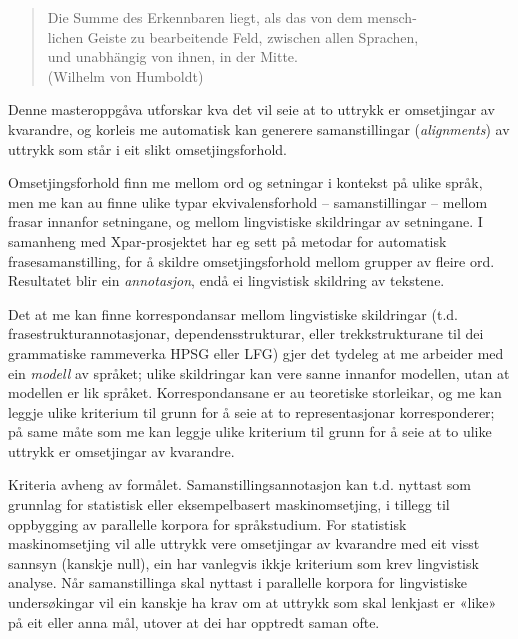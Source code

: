 \documentclass[12pt,a4paper,oneside,draft]{report}
\newcommand{\q}[2]{\begin{quotation}\raggedleft{}#1\\\vspace{0.2cm}(#2)\vspace{1.2cm}\end{quotation}}
\begin{document}
\label{SEC:innleiing}

   \q{Die Summe des Erkennbaren liegt, als das von dem mensch-\\lichen
   Geiste zu bearbeitende Feld, zwischen allen Sprachen,\\
   und unabhängig von ihnen, in der Mitte.}
   {Wilhelm von Humboldt}


Denne masteroppgåva utforskar kva det vil seie at to uttrykk er
 omsetjingar av kvarandre, og korleis me automatisk kan generere
 samanstillingar (\emph{alignments}) av uttrykk som står i eit slikt
 omsetjingsforhold.

Omsetjingsforhold finn me mellom ord og setningar i kontekst på ulike
 språk, men me kan au finne ulike typar ekvivalensforhold --
 samanstillingar -- mellom frasar innanfor setningane, og mellom
 lingvistiske skildringar av setningane. I samanheng med
 Xpar-prosjektet \citep{xpar2008rcn,dyvik2009lmp} har eg sett på
 metodar for automatisk frasesamanstilling, for å skildre
 omsetjingsforhold mellom grupper av fleire ord. Resultatet blir ein
 \emph{annotasjon}, endå ei lingvistisk skildring av tekstene.



Det at me kan finne korrespondansar mellom lingvistiske skildringar
 (t.d. frasestrukturannotasjonar, dependensstrukturar, eller
 trekkstrukturane til dei grammatiske rammeverka HPSG eller LFG) gjer
 det tydeleg at me arbeider med ein \emph{modell} av språket; ulike
 skildringar kan vere sanne innanfor modellen, utan at modellen er lik
 språket. Korrespondansane er au teoretiske storleikar, og me kan
 leggje ulike kriterium til grunn for å seie at to representasjonar
 korresponderer; på same måte som me kan leggje ulike kriterium til
 grunn for å seie at to ulike uttrykk er omsetjingar av kvarandre.

Kriteria avheng av formålet. Samanstillingsannotasjon kan t.d. nyttast
 som grunnlag for statistisk eller eksempelbasert maskinomsetjing, i
 tillegg til oppbygging av parallelle korpora for språkstudium.  For
 statistisk maskinomsetjing vil alle uttrykk vere omsetjingar av
 kvarandre med eit visst sannsyn (kanskje null), ein har vanlegvis
 ikkje kriterium som krev lingvistisk analyse. Når samanstillinga skal
 nyttast i parallelle korpora for lingvistiske undersøkingar vil ein
 kanskje ha krav om at uttrykk som skal lenkjast er «like» på eit
 eller anna mål, utover at dei har opptredt saman ofte.
\end{document}
